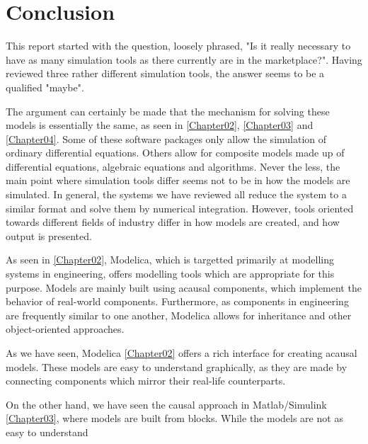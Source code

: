 \documentclass[\rootfolder/main.tex]{subfiles}
\begin{document}
\chapter{Conclusion} %

\label{Chapter6} %

This report started with the question, loosely phrased, "Is it really necessary to have as many simulation tools as there currently are in the marketplace?".
Having reviewed three rather different simulation tools, the answer seems to be a qualified "maybe".

The argument can certainly be made that the mechanism for solving these models is essentially the same, as seen in \ref{Chapter02}, \ref{Chapter03} and \ref{Chapter04}.
Some of these software packages only allow the simulation of ordinary differential equations.
Others allow for composite models made up of differential equations, algebraic equations and algorithms.
Never the less, the main point where simulation tools differ seems not to be in how the models are simulated.
In general, the systems we have reviewed all reduce the system to a similar format and solve them by numerical integration.
However, tools oriented towards different fields of industry differ in how models are created, and how output is presented.

As seen in \ref{Chapter02}, Modelica, which is targetted primarily at modelling systems in engineering, offers modelling tools which are appropriate for this purpose.
Models are mainly built using acausal components, which implement the behavior of real-world components.
Furthermore, as components in engineering are frequently similar to one another, Modelica allows for inheritance and other object-oriented approaches.

As we have seen, Modelica \ref{Chapter02} offers a rich interface for creating acausal models.
These models are easy to understand graphically, as they are made by connecting components which mirror their real-life counterparts.

On the other hand, we have seen the causal approach in Matlab/Simulink \ref{Chapter03}, where models are built from blocks.
While the models are not as easy to understand 
\end{document}
